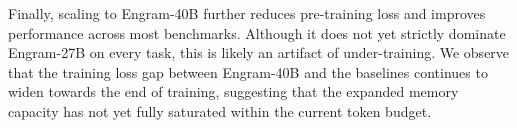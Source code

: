 Finally, scaling to Engram-40B further reduces pre-training loss and improves performance across most benchmarks. Although it does not yet strictly dominate Engram-27B on every task, this is likely an artifact of under-training. We observe that the training loss gap between Engram-40B and the baselines continues to widen towards the end of training, suggesting that the expanded memory capacity has not yet fully saturated within the current token budget.


